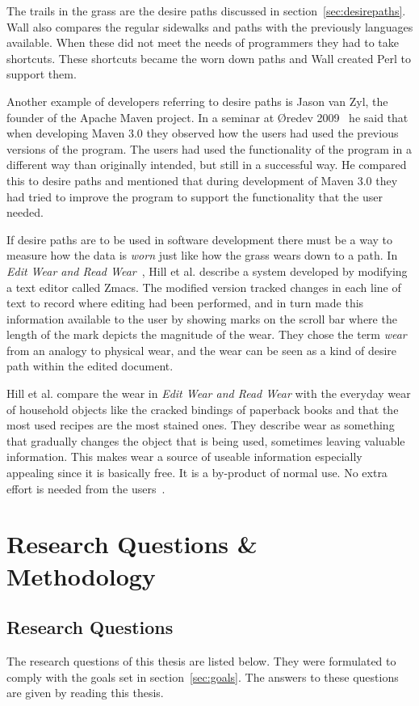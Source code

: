 \documentclass[a4paper]{report}
\begin{document}
The trails in the grass are the desire paths discussed in section~\ref{sec:desirepaths}. Wall also compares the regular sidewalks and paths with the previously languages available. When these did not meet the needs of programmers they had to take shortcuts. These shortcuts became the worn down paths and Wall created Perl to support them.

Another example of developers referring to desire paths is Jason van Zyl, the founder of the Apache Maven project. In a seminar at Øredev 2009~\cite{Zyl:2009} he said that when developing Maven 3.0 they observed how the users had used the previous versions of the program. The users had used the functionality of the program in a different way than originally intended, but still in a successful way. He compared this to desire paths and mentioned that during development of Maven 3.0 they had tried to improve the program to support the functionality that the user needed.

If desire paths are to be used in software development there must be a way to measure how the data is \emph{worn} just like how the grass wears down to a path. In \emph{Edit Wear and Read Wear}~\cite{Hill-et-al:1992}, Hill et al. describe a system developed by modifying a text editor called Zmacs. The modified version tracked changes in each line of text to record where editing had been performed, and in turn made this information available to the user by showing marks on the scroll bar where the length of the mark depicts the magnitude of the wear. They chose the term \emph{wear} from an analogy to physical wear, and the wear can be seen as a kind of desire path within the edited document.

Hill et al. compare the wear in \emph{Edit Wear and Read Wear} with the everyday wear of household objects like the cracked bindings of paperback books and that the most used recipes are the most stained ones. They describe wear as something that gradually changes the object that is being used, sometimes leaving valuable information. This makes wear a source of useable information especially appealing since it is basically free. It is a by-product of normal use. No extra effort is needed from the users~\cite{Hill-et-al:1992}.

\chapter{Research Questions \& Methodology} \label{chap:research-questions-methodology}

\section{Research Questions}
The research questions of this thesis are listed below. They were formulated to comply with the goals set in section~\ref{sec:goals}. The answers to these questions are given by reading this thesis.
\end{document}
